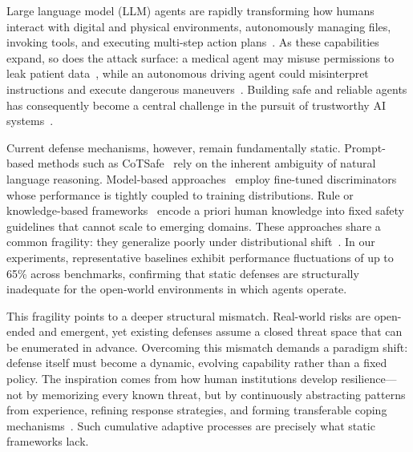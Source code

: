 \label{sec:intros}

Large language model (LLM) agents are rapidly transforming how humans interact with digital and physical environments, autonomously managing files, invoking tools, and executing multi-step action plans~\citep{gao2025evovlesurvey,yu2025finmem,yang2024llmpsychology,gur2023webagent}. As these capabilities expand, so does the attack surface: a medical agent may misuse permissions to leak patient data~\citep{yuan2024rjudge}, while an autonomous driving agent could misinterpret instructions and execute dangerous maneuvers~\citep{han2025dme,mao2023driving}. Building safe and reliable agents has consequently become a central challenge in the pursuit of trustworthy AI systems~\citep{fang2025comprehensivesurveyselfevolvingai}.

Current defense mechanisms, however, remain fundamentally static. Prompt-based methods such as CoTSafe~\citep{yin2024safeagentbench} rely on the inherent ambiguity of natural language reasoning. Model-based approaches~\citep{zhang2024asb} employ fine-tuned discriminators whose performance is tightly coupled to training distributions. Rule or knowledge-based frameworks~\citep{xiang2024guardagent,sadhu2024athena} encode a priori human knowledge into fixed safety guidelines that cannot scale to emerging domains. These approaches share a common fragility: they generalize poorly under distributional shift~\citep{shahriar2025survey}. In our experiments, representative baselines exhibit performance fluctuations of up to 65\% across benchmarks, confirming that static defenses are structurally inadequate for the open-world environments in which agents operate.

This fragility points to a deeper structural mismatch. Real-world risks are open-ended and emergent, yet existing defenses assume a closed threat space that can be enumerated in advance. Overcoming this mismatch demands a paradigm shift: defense itself must become a dynamic, evolving capability rather than a fixed policy. The inspiration comes from how human institutions develop resilience---not by memorizing every known threat, but by continuously abstracting patterns from experience, refining response strategies, and forming transferable coping mechanisms~\citep{cai2025building}. Such cumulative adaptive processes are precisely what static frameworks lack.

